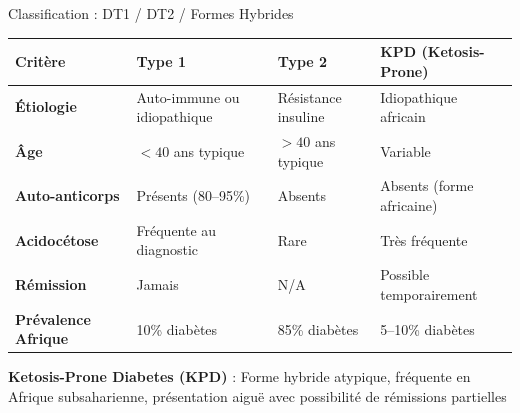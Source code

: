 \documentclass[11pt, aspectratio=169]{beamer}
\begin{document}
\begin{frame}{Classification : DT1 / DT2 / Formes Hybrides}
  \begin{table}[h]
    \tiny
    \centering
    \begin{tabularx}{\textwidth}{|l|X|X|X|}
      \toprule
      \textbf{Critère} & \textbf{Type 1} & \textbf{Type 2} & \textbf{KPD (Ketosis-Prone)} \\
      \midrule
      \textbf{Étiologie} & Auto-immune ou idiopathique & Résistance insuline & Idiopathique africain \\
      \textbf{Âge} & $<40$ ans typique & $>40$ ans typique & Variable \\
      \textbf{Auto-anticorps} & Présents (80--95\%) & Absents & Absents (forme africaine) \\
      \textbf{Acidocétose} & Fréquente au diagnostic & Rare & Très fréquente \\
      \textbf{Rémission} & Jamais & N/A & Possible temporairement \\
      \textbf{Prévalence Afrique} & 10\% diabètes & 85\% diabètes & 5--10\% diabètes \\
      \bottomrule
    \end{tabularx}
  \end{table}
  
  \vspace{0.8em}
  
  \textbf{\textcolor{accent1}{Ketosis-Prone Diabetes (KPD)}} : Forme hybride atypique, fréquente en Afrique subsaharienne, présentation aiguë avec possibilité de rémissions partielles
\end{frame}
\end{document}
